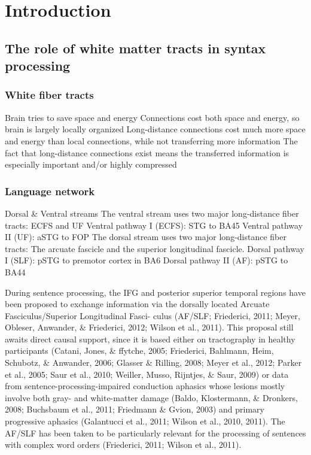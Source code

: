 \chapter{Introduction}

\section{The role of white matter tracts in syntax processing}

\subsection{White fiber tracts}
Brain tries to save space and energy
Connections cost both space and energy, so brain is largely locally organized
Long-distance connections cost much more space and energy than local connections, while not transferring more information
The fact that long-distance connections exist means the transferred information is especially important and/or highly compressed

\subsection{Language network}
Dorsal \& Ventral streams
The ventral stream uses two major long-distance fiber tracts: ECFS and UF
Ventral pathway I (ECFS): STG to BA45
Ventral pathway II (UF): aSTG to FOP
The dorsal stream uses two major long-distance fiber tracts: The arcuate fascicle and the superior longitudinal fascicle.
Dorsal pathway I (SLF): pSTG to premotor cortex in BA6
Dorsal pathway II (AF): pSTG to BA44

During sentence processing, the IFG and posterior superior
 temporal regions have been proposed to exchange information via
 the dorsally located Arcuate Fasciculus/Superior Longitudinal Fasci-
 culus (AF/SLF; Friederici, 2011; Meyer, Obleser, Anwander, \&
 Friederici, 2012; Wilson et al., 2011). This proposal still awaits direct
 causal support, since it is based either on tractography in healthy
 participants (Catani, Jones, \& ffytche, 2005; Friederici, Bahlmann,
 Heim, Schubotz, \& Anwander, 2006; Glasser \& Rilling, 2008; Meyer
 et al., 2012; Parker et al., 2005; Saur et al., 2010; Weiller, Musso,
 Rijntjes, \& Saur, 2009) or data from sentence-processing-impaired
 conduction aphasics whose lesions mostly involve both gray- and
 white-matter damage (Baldo, Klostermann, \& Dronkers, 2008; Buchsbaum et al., 2011; Friedmann \& Gvion, 2003) and primary
 progressive aphasics (Galantucci et al., 2011; Wilson et al., 2010,
 2011). The AF/SLF has been taken to be particularly relevant for the
 processing of sentences with complex word orders (Friederici,
 2011; Wilson et al., 2011).

